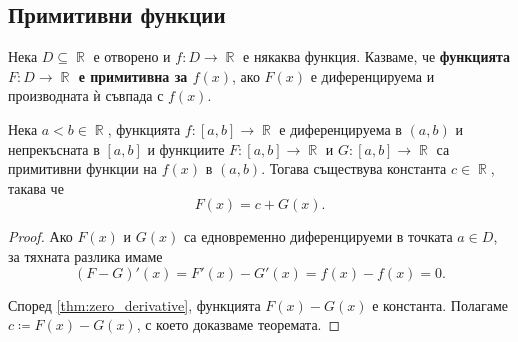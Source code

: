\documentclass{../../common/topic}
\begin{document}
\subsection{Примитивни функции}

\begin{definition}
  Нека \( D \subseteq \BbbR \) е отворено и \( f: D \to \BbbR \) е някаква функция. Казваме, че \textbf{функцията \( F: D \to \BbbR \) е примитивна за \( f(x) \)}, ако \( F(x) \) е диференцируема и производната ѝ съвпада с \( f(x) \).
\end{definition}

\begin{theorem}
Нека \( a < b \in \BbbR \), функцията \( f: [a, b] \to \BbbR \) е диференцируема в \( (a, b) \) и непрекъсната в \( [a, b] \) и функциите \( F: [a, b] \to \BbbR \) и \( G: [a, b] \to \BbbR \) са примитивни функции на \( f(x) \) в \( (a, b) \). Тогава съществува константа \( c \in \BbbR \), такава че
  \begin{equation*}
    F(x) = c + G(x).
  \end{equation*}
\end{theorem}
\begin{proof}
  Ако \( F(x) \) и \( G(x) \) са едновременно диференцируеми в точката \( a \in D \), за тяхната разлика имаме
  \begin{equation*}
    (F - G)'(x)
    =
    F'(x) - G'(x)
    =
    f(x) - f(x)
    =
    0.
  \end{equation*}

  Според \cref{thm:zero_derivative}, функцията \( F(x) - G(x) \) е константа. Полагаме \( c \coloneqq F(x) - G(x) \), с което доказваме теоремата.
\end{proof}

\begin{sloppypar}
  \printbibliography
\end{sloppypar}
\end{document}
